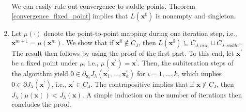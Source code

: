 \begin{IEEEproof}
\begin{enumerate}
	
	We can easily rule out convergence to saddle points. Theorem \ref{convergence_fixed_point} implies that $L(\mathbf{x}^0)$ is nonempty and singleton.
	
	\item Let $\mu(\cdot)$ denote the point-to-point mapping during one iteration step, i.e., $\mathbf{x}^{m+1}=\mu(\mathbf{x}^m)$. We show that if $\mathbf{x}^0 \notin C_J$, then $L(\mathbf{x}^0) \subseteq C_{J,min} \cup C_{J,saddle}$. The result then follows by using the proof of the first part. To this end, let $\mathbf{x}^{'}$ be a fixed point under $\mu$, i.e., $\mu(\mathbf{x}^{'})=\mathbf{x}^{'}$. Then, the subiteration steps of the algorithm yield $0\in \partial_{\mathbf{x}_i} J_\lambda(\mathbf{x}_1^{'},\dots,\mathbf{x}_k^{'})$ for $i=1,\dots,k$, which implies $0\in \partial J_\lambda(\mathbf{x}^{'})$, i.e., $\mathbf{x}^{'}\in C_J$. The contrapositive implies that if $\mathbf{x}\notin C_J$, then $J_\lambda(\mu(\mathbf{x}))<J_\lambda(\mathbf{x})$. A simple induction on the number of iterations then concludes the proof.
\end{enumerate}
	
\end{IEEEproof}
